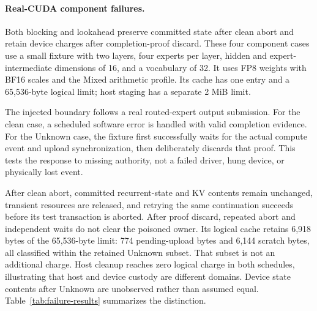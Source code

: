 \paragraph{Real-CUDA component failures.}
Both blocking and lookahead preserve committed state after clean abort and
retain device charges after completion-proof discard. These four component
cases use a small fixture with two
layers, four experts per layer, hidden and expert-intermediate dimensions of
16, and a vocabulary of 32. It uses FP8 weights with BF16 scales and the Mixed
arithmetic profile. Its cache has one entry and a 65,536-byte logical limit;
host staging has a separate 2 MiB limit.

The injected boundary follows a real routed-expert output submission.
For the clean case, a scheduled software error is handled with valid
completion evidence. For the Unknown case, the fixture first successfully
waits for the actual compute event and upload synchronization, then deliberately
discards that proof. This tests the response to missing authority, not a
failed driver, hung device, or physically lost event.

After clean abort, committed recurrent-state and KV contents remain unchanged,
transient resources are released, and retrying the same continuation succeeds
before its test transaction is aborted. After proof discard, repeated abort
and independent waits do not clear the poisoned owner. Its logical cache
retains 6,918 bytes of the 65,536-byte limit: 774 pending-upload bytes and
6,144 scratch bytes, all classified within the retained Unknown subset.
That subset is not an additional charge. Host cleanup reaches zero logical
charge in both schedules, illustrating that host and device custody are
different domains. Device state contents after Unknown are unobserved rather
than assumed equal. Table~\ref{tab:failure-results} summarizes the distinction.

